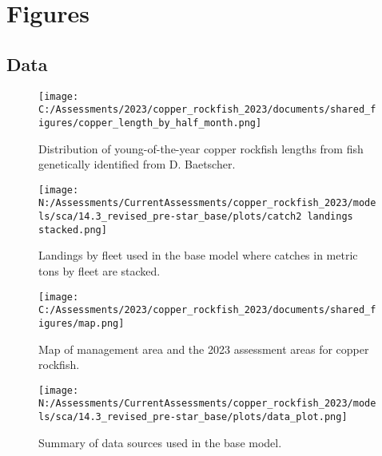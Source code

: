 \documentclass[11pt,
  english,
  letterpaper,
]{article}
\begin{document}
\newpage

\clearpage


\hypertarget{figures}{%
\section{Figures}\label{figures}}

\hypertarget{data-1}{%
\subsection{Data}\label{data-1}}

\begin{figure}
\centering
\texttt{[image: C:/Assessments/2023/copper\_rockfish\_2023/documents/shared\_figures/copper\_length\_by\_half\_month.png]}
\caption{Distribution of young-of-the-year copper rockfish lengths from fish genetically identified from D. Baetscher.\label{fig:copper-smurf-length}}
\end{figure}

\pagebreak

\begin{figure}
\centering
\texttt{[image: N:/Assessments/CurrentAssessments/copper\_rockfish\_2023/models/sca/14.3\_revised\_pre-star\_base/plots/catch2 landings stacked.png]}
\caption{Landings by fleet used in the base model where catches in metric tons by fleet are stacked.\label{fig:catch}}
\end{figure}

\pagebreak

\begin{figure}
\centering
\texttt{[image: C:/Assessments/2023/copper\_rockfish\_2023/documents/shared\_figures/map.png]}
\caption{Map of management area and the 2023 assessment areas for copper rockfish.\label{fig:ca-map}}
\end{figure}

\pagebreak

\begin{figure}
\centering
\texttt{[image: N:/Assessments/CurrentAssessments/copper\_rockfish\_2023/models/sca/14.3\_revised\_pre-star\_base/plots/data\_plot.png]}
\caption{Summary of data sources used in the base model.\label{fig:data-plot}}
\end{figure}

\pagebreak
\end{document}
